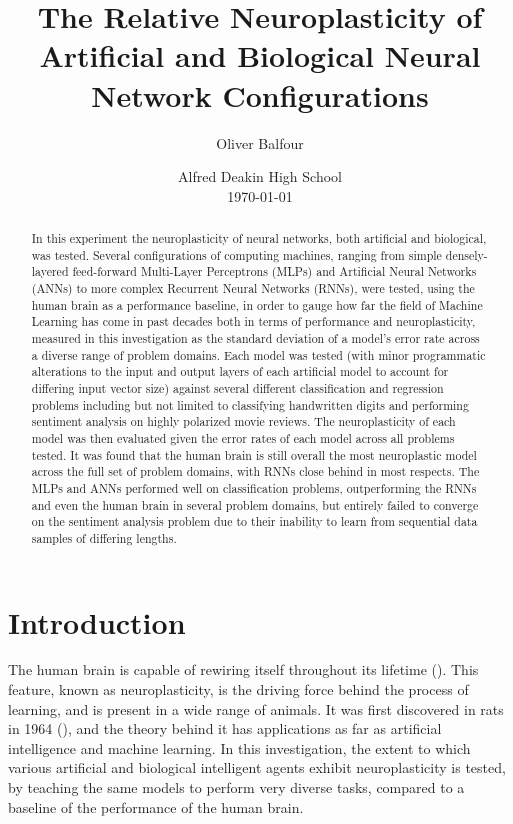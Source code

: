 \documentclass[]{report}
\title{
	The Relative Neuroplasticity of Artificial
	\linebreak
	and Biological Neural Network Configurations
}
\author{Oliver Balfour}
\date{%
	Alfred Deakin High School\\[2ex]%
	\today
}
\begin{document}
\maketitle

\begin{abstract}
	In this experiment the neuroplasticity of neural networks, both artificial and biological, was tested. Several configurations of computing machines, ranging from simple densely-layered feed-forward Multi-Layer Perceptrons (MLPs) and Artificial Neural Networks (ANNs) to more complex Recurrent Neural Networks (RNNs), were tested, using the human brain as a performance baseline, in order to gauge how far the field of Machine Learning has come in past decades both in terms of performance and neuroplasticity, measured in this investigation as the standard deviation of a model's error rate across a diverse range of problem domains. Each model was tested (with minor programmatic alterations to the input and output layers of each artificial model to account for differing input vector size) against several different classification and regression problems including but not limited to classifying handwritten digits and performing sentiment analysis on highly polarized movie reviews. The neuroplasticity of each model was then evaluated given the error rates of each model across all problems tested. It was found that the human brain is still overall the most neuroplastic model across the full set of problem domains, with RNNs close behind in most respects. The MLPs and ANNs performed well on classification problems, outperforming the RNNs and even the human brain in several problem domains, but entirely failed to converge on the sentiment analysis problem due to their inability to learn from sequential data samples of differing lengths.
\end{abstract}

\tableofcontents
\newpage

\section{Introduction}

The human brain is capable of rewiring itself throughout its lifetime (\cite{draganski2004neuroplasticity}). This feature, known as neuroplasticity, is the driving force behind the process of learning, and is present in a wide range of animals. It was first discovered in rats in 1964 (\cite{bennett1964chemical}), and the theory behind it has applications as far as artificial intelligence and machine learning. In this investigation, the extent to which various artificial and biological intelligent agents exhibit neuroplasticity is tested, by teaching the same models to perform very diverse tasks, compared to a baseline of the performance of the human brain.
\end{document}

